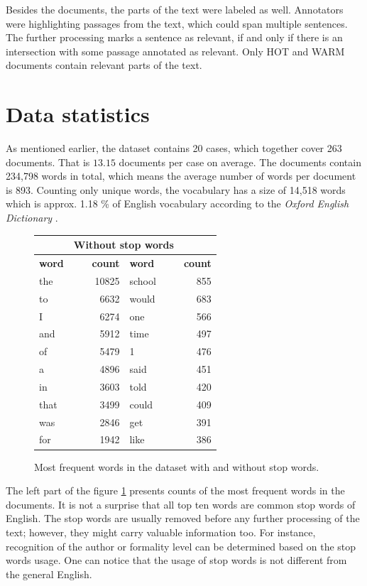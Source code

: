 \documentclass[
  digital, %
  notable,   %
  nolof,     %
  nolot,     %
]{fithesis3}
\begin{document}
Besides the documents, the parts of the text were labeled as well.
Annotators were highlighting passages from the text, which could span multiple sentences.
The further processing marks a sentence as relevant, if and only if there is an intersection with some passage annotated as relevant.
Only HOT and WARM documents contain relevant parts of the text.

\section{Data statistics}
As mentioned earlier, the dataset contains 20 cases, which together cover 263 documents. That is $13.15$ documents per case on average.
The documents contain 234,798 words in total, which means the average number of words per document is 893.
Counting only unique words, the vocabulary has a size of 14,518 words which is approx. 1.18 \% of English vocabulary according to the \textit{Oxford English Dictionary}  \cite{oxfordDictionaries}.

\begin{figure}[h]
\centering
\caption{Most frequent words in the dataset with and without stop words.}
\label{fig:most_frequent}
\footnotesize
\begin{tabular}{|l|r||l|r|}\hline
\rowcolor{orange!50}
\multicolumn{2}{|c||}{\makebox[9em]{\textbf{All words}}} & \multicolumn{2}{|c|}{\textbf{Without stop words}} \\\hline\hline
\textbf{word} & \textbf{count} & \textbf{word} & \textbf{count} \\\hline\hline
the & 10825 & school & 855 \\\hline
to & 6632 & would & 683 \\\hline
I & 6274 & one & 566 \\\hline
and & 5912 & time & 497 \\\hline
of & 5479 & 1 & 476 \\\hline
a & 4896 & said & 451 \\\hline
in & 3603 & told & 420 \\\hline
that & 3499 & could & 409 \\\hline
was & 2846 & get & 391 \\\hline
for & 1942 & like & 386 \\\hline
\end{tabular}
\normalsize
\end{figure}

The left part of the figure \ref{fig:most_frequent} presents counts of the most frequent words in the documents.
It is not a surprise that all top ten words are common stop words of English.
The stop words are usually removed before any further processing of the text; however, they might carry valuable information too.
For instance, recognition of the author or formality level can be determined based on the stop words usage.
One can notice that the usage of stop words is not different from the general English.
\end{document}
